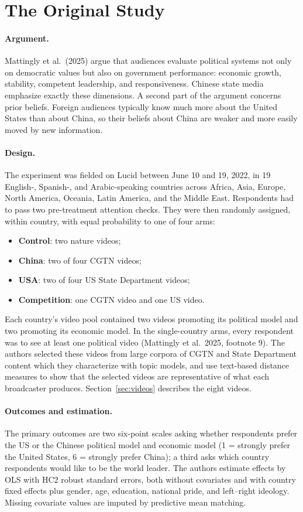 \documentclass[11pt]{article}
\begin{document}
\section{The Original Study}

\paragraph{Argument.} Mattingly et al.\ (2025) argue that audiences evaluate political systems not only on democratic values but also on government performance: economic growth, stability, competent leadership, and responsiveness. Chinese state media emphasize exactly these dimensions. A second part of the argument concerns prior beliefs. Foreign audiences typically know much more about the United States than about China, so their beliefs about China are weaker and more easily moved by new information.

\paragraph{Design.} The experiment was fielded on Lucid between June 10 and 19, 2022, in 19 English-, Spanish-, and Arabic-speaking countries across Africa, Asia, Europe, North America, Oceania, Latin America, and the Middle East. Respondents had to pass two pre-treatment attention checks. They were then randomly assigned, within country, with equal probability to one of four arms:
\begin{itemize}\setlength\itemsep{0pt}
  \item \textbf{Control}: two nature videos;
  \item \textbf{China}: two of four CGTN videos;
  \item \textbf{USA}: two of four US State Department videos;
  \item \textbf{Competition}: one CGTN video and one US video.
\end{itemize}
Each country's video pool contained two videos promoting its political model and two promoting its economic model. In the single-country arms, every respondent was to see at least one political video (Mattingly et al.\ 2025, footnote 9). The authors selected these videos from large corpora of CGTN and State Department content which they characterize with topic models, and use text-based distance measures to show that the selected videos are representative of what each broadcaster produces. Section~\ref{sec:videos} describes the eight videos.

\paragraph{Outcomes and estimation.} The primary outcomes are two six-point scales asking whether respondents prefer the US or the Chinese political model and economic model (1 = strongly prefer the United States, 6 = strongly prefer China); a third asks which country respondents would like to be the world leader. The authors estimate effects by OLS with HC2 robust standard errors, both without covariates and with country fixed effects plus gender, age, education, national pride, and left--right ideology. Missing covariate values are imputed by predictive mean matching.
\end{document}

